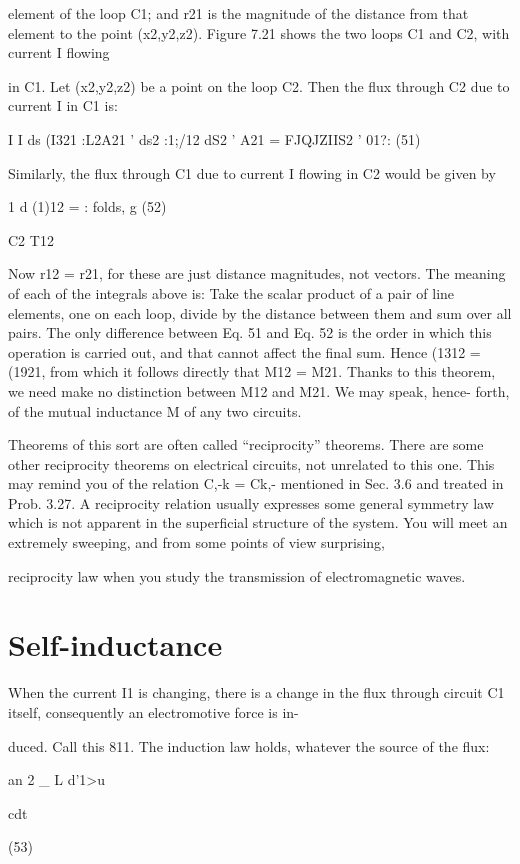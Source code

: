 element of the loop C1; and r21 is the magnitude of the distance from
that element to the point (x2,y2,z2).
Figure 7.21 shows the two loops C1 and C2, with current I flowing

in C1. Let (x2,y2,z2) be a point on the loop C2. Then the flux
through C2 due to current I in C1 is:

I I ds
(I321 :L2A21 ' ds2 :1;/12 dS2 ' A21 = FJQJZIIS2 ' 01?: (51)

Similarly, the flux through C1 due to current I flowing in C2 would
be given by

1 d
(1)12 = : folds, g (52)

C2 T12

Now r12 = r21, for these are just distance magnitudes, not vectors.
The meaning of each of the integrals above is: Take the scalar product
of a pair of line elements, one on each loop, divide by the distance
between them and sum over all pairs. The only difference between
Eq. 51 and Eq. 52 is the order in which this operation is carried out,
and that cannot affect the final sum. Hence (1312 = (1921, from which
it follows directly that M12 = M21. Thanks to this theorem, we need
make no distinction between M12 and M21. We may speak, hence-
forth, of the mutual inductance M of any two circuits.

Theorems of this sort are often called ``reciprocity'' theorems.
There are some other reciprocity theorems on electrical circuits, not
unrelated to this one. This may remind you of the relation C,-k = Ck,-
mentioned in Sec. 3.6 and treated in Prob. 3.27. A reciprocity relation
usually expresses some general symmetry law which is not apparent
in the superficial structure of the system. You will meet an
extremely sweeping, and from some points of view surprising,

reciprocity law when you study the transmission of electromagnetic
waves.

\section{Self-inductance}
When the current I1 is changing, there is a change in the flux
through circuit C1 itself, consequently an electromotive force is in-

duced. Call this 811. The induction law holds, whatever the source
of the flux:

an 2 _ L d'1>u

cdt

(53)


